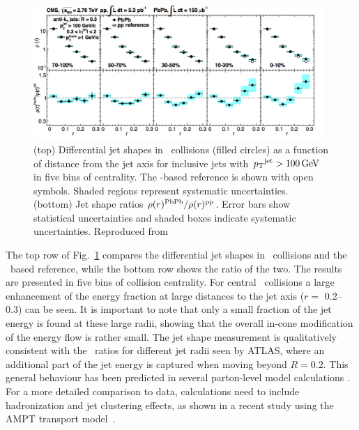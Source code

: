\begin{figure}[!ht]
\begin{center}
\includegraphics[width=0.98\textwidth]{jetfigures/JetShapes_GR.png}
\caption{\label{fig:JSRatio}
(top) Differential jet shapes in \PbPb\ collisions (filled circles)
as a function of distance from the jet axis for inclusive jets with $\mbox{$p_{\mathrm{T}}$}^{\rm{jet}} >100\,\mathrm{GeV}$
in five bins of centrality.  The \pp-based reference is shown with open symbols.
Shaded regions represent systematic uncertainties.
(bottom) Jet shape ratios $\rho(r)^{\rm{PbPb}}/\rho(r)^{\rm{pp}}$.
Error bars show statistical uncertainties and shaded boxes indicate systematic uncertainties.
Reproduced from~\cite{Chatrchyan:2013kwa}}
\label{fig:GR:CMS_jetshapes}
\end{center}
\end{figure}

The top row of Fig.~\ref{fig:GR:CMS_jetshapes} compares the differential jet shapes in \PbPb\
collisions and the \pp\ based reference, while the bottom row shows the ratio of the two.
The results are presented in five bins of collision centrality.
For central \PbPb\ collisions a large enhancement of the energy fraction at large distances
to the jet axis ($r = $ 0.2--0.3) can be seen. It is important to note that only a small
fraction of the jet energy is found at these large radii, showing that the overall in-cone
modification of the energy flow is rather small.
The jet shape measurement is qualitatively consistent with the \Rcp\ ratios for different jet radii seen by ATLAS,
where an additional part of the jet energy is captured when moving beyond $R = 0.2$.
This general behaviour has been predicted in several parton-level model
calculations \cite{Vitev:2008rz,Renk:2009hv}.
For a more detailed comparison to data, calculations need to include hadronization and
jet clustering effects, as shown in a recent study using the AMPT transport model~\cite{Ma:2013uqa}.

